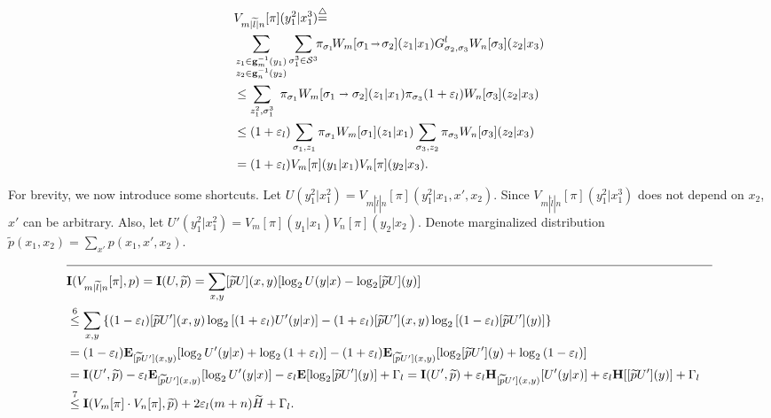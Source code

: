 \documentclass[journal, twocol]{IEEEtran}
\newcommand{\tl}{{\widetilde{l}}}
\newcommand{\tp}{{\widetilde{p}}}
\newcommand{\bfE}{{\mathbf{E}}}
\newcommand{\bfH}{{\mathbf{H}}}
\newcommand{\tH}{{\widetilde{H}}}
\newcommand{\bfI}{{\mathbf{I}}}
\newcommand{\mS}{{\mathcal{S}}}
\newcommand{\set}[1]{{\left\{{#1}\right\}}}
\newcommand{\br}[1]{{\left({#1}\right)}}
\newcommand{\brsq}[1]{{\left[{#1}\right]}}
\newcommand{\defeq}{{\overset{\triangle}{=}}}
\newcommand{\ve}{\varepsilon}
\newcommand{\toshort}{\shortrightarrow}
\newcommand{\bg}{\mathbf{g}}
\newcommand{\pW}[2]{[{#1}{#2}]}
\newcommand{\pWd}[2]{[{#1}{#2}]}
\newcommand{\pWyd}[2]{[{#1}{#2}]}
\begin{document}
{\allowdisplaybreaks
\begin{align}
&V_{m|\tl|n}[\pi](y_1^2|x_1^3) \defeq
\nonumber\\&
\sum_{\substack{z_1\in\bg^{-1}_{m}(y_1)\\z_2\in\bg^{-1}_{n}(y_2)}} 
\sum_{\sigma_1^3\in\mS^3}\!\!
\pi_{\sigma_1}\! W_m[\sigma_1\!\toshort\!\sigma_2]\br{z_1|x_1}
G^l_{\sigma_2,\sigma_3} 
W_n[\sigma_3](z_2|x_3)
\nonumber \\ 
&\leq
\sum_{z_1^2,\sigma_1^3}~
\pi_{\sigma_1} W_m[\sigma_1\toshort\sigma_2]\br{z_1|x_1}
\pi_{\sigma_3} (1+\ve_l)
W_n[\sigma_3](z_2|x_3)
\nonumber \\
&\leq
(1+\ve_l)
\sum_{\sigma_1,z_1}
\pi_{\sigma_1} W_m[\sigma_1]\br{z_1|x_1}
\sum_{\sigma_3,z_2}
\pi_{\sigma_3}W_n[\sigma_3](z_2|x_3)
\nonumber \\&
=(1+\ve_l)V_m[\pi](y_1|x_1)V_n[\pi](y_2|x_3).
\label{eq:Vmln-l}
\end{align}
}

For brevity, we now introduce some shortcuts.
Let $U(y_1^2|x_1^2)=V_{m|\tl|n}[\pi](y_1^2|x_1,x',x_2)$.
Since $V_{m|\tl|n}[\pi](y_1^2|x_1^3)$ does not depend on $x_2$, $x'$ can be arbitrary.
Also, let $U'(y_1^2|x_1^2)=V_{m}[\pi](y_1|x_1)V_{n}[\pi](y_2|x_2)$.
Denote marginalized distribution $\tp(x_1,x_2)=\sum_{x'}p(x_1,x',x_2)$.
\begin{figure}[b]
\vspace{-11pt}
\begin{align}
\hline\nonumber\\[-11pt]
&\bfI(V_{m|\tl|n}[\pi],p)=\bfI(U,\tp) 
=\sum_{x,y}\pWd{\tp}{U}(x,y) \brsq{
\log_2 U(y|x)
-\log_2 \pWyd{\tp}{U}(y)
}\nonumber \\
&\stackrel{6}{\leq}
\sum_{x,y}\set{(1-\ve_l)\pWd{\tp}{U'}(x,y) \log_2 \brsq{(1+\ve_l) U'(y|x)}
-(1+\ve_l)\pWd{\tp}{U'}(x,y) \log_2 \brsq{(1-\ve_l) \pWyd{\tp}{U'}(y)}}
\nonumber \\&
=(1-\ve_l)\bfE_{\pW{\tp}{U'}(x,y)}\brsq{\log_2 U'(y|x) + \log_2\br{1+\ve_l}}
-(1+\ve_l)\bfE_{\pW{\tp}{U'}(x,y)}
\brsq{\log_2 \pWyd{\tp}{U'}(y) + \log_2\br{1-\ve_l}}
\nonumber \\&
= \bfI(U',\tp)
-\ve_l \bfE_{\pW{\tp}{U'}(x,y)}\brsq{\log_2 U'(y|x)}
-\ve_l \bfE\brsq{\log_2 \pWyd{\tp}{U'}(y)}
+ \Gamma_l
= \bfI(U',\tp)
+ \ve_l \bfH_{\pW{\tp}{U'}(x,y)}\brsq{U'(y|x)}
+ \ve_l \bfH\brsq{\pWyd{\tp}{U'}(y)}
+ \Gamma_l
\nonumber \\&
\stackrel{7}{\leq} \bfI(V_m[\pi]\cdot V_n[\pi],\tp) + 2\ve_l(m+n)\tH+\Gamma_l.
\label{eq:UU'}
\end{align}
\end{figure}%
\end{document}

